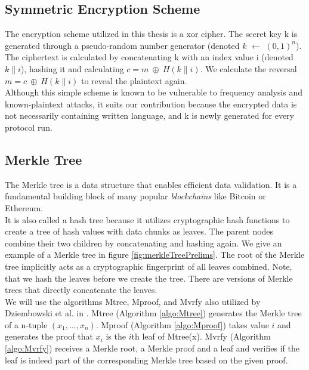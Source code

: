 \documentclass{cacthesis}
\newcounter{protocol}
\begin{document}
            \subsection{Symmetric Encryption Scheme}
            \label{sub:SymmetricEncryptionScheme}
	        The encryption scheme utilized in this thesis is a xor cipher. The secret key k is generated through a pseudo-random number generator (denoted $k$ $\leftarrow$ $(0, 1)^n$). The ciphertext is calculated by concatenating k with an index value i (denoted $k\|i$), hashing it and calculating  $c = m \ \oplus \ H(k\|i)$. We calculate the reversal $m = c \ \oplus \ H(k\|i)$ to reveal the plaintext again. \\
            Although this simple scheme is known to be vulnerable to frequency analysis and known-plaintext attacks, it suits our contribution because the encrypted data is not necessarily containing written language, and k is newly generated for every protocol run.

            \subsection{Merkle Tree}
            \label{sub:MerkleTree}
	        The Merkle tree is a data structure that enables efficient data validation. It is a fundamental building block of many popular \textit{blockchains} like Bitcoin or Ethereum. \\
            It is also called a hash tree because it utilizes cryptographic hash functions to create a tree of hash values with data chunks as leaves. The parent nodes combine their two children by concatenating and hashing again. We give an example of a Merkle tree in figure \ref{fig:merkleTreePrelims}. The root of the Merkle tree implicitly acts as a cryptographic fingerprint of all leaves combined. Note, that we hash the leaves before we create the tree. There are versions of Merkle trees that directly concatenate the leaves. \\
            We will use the algorithms \textsf{Mtree}, \textsf{Mproof}, and \textsf{Mvrfy} also utilized by Dziembowski et al. in \cite{10.1145/3243734.3243857}. \textsf{Mtree} (Algorithm \ref{algo:Mtree}) generates the Merkle tree of a n-tuple $(x_1, ..., x_n)$. \textsf{Mproof} (Algorithm \ref{algo:Mproof}) takes value $i$ and generates the proof that $x_i$ is the $i$th leaf of \textsf{Mtree(x)}. \textsf{Mvrfy} (Algorithm \ref{algo:Mvrfy}) receives a Merkle root, a Merkle proof and a leaf and verifies if the leaf is indeed part of the corresponding Merkle tree based on the given proof.
            
\end{document}
